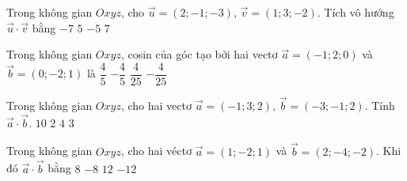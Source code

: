 

\begin{ex}%
	Trong không gian $Oxyz$, cho $\overrightarrow{u}=(2;-1;-3)$, $\overrightarrow{v}=(1;3;-2)$.  Tích vô hướng $\overrightarrow{u}\cdot \overrightarrow{v}$ bằng
	 \choice
		{$-7$} 
		{\True $5$} 
		 {$-5$}
		{$7$} 
\end{ex}

\begin{ex}%
	Trong không gian  $Oxyz$, cosin của góc tạo bởi hai vectơ $\overrightarrow{a}=(-1;2;0)$ và $\overrightarrow{b}=(0;-2;1)$ là
	\choice 
		 {$\dfrac{4}{5}$}
		{\True $-\dfrac{4}{5}$} 
		{$\dfrac{4}{25}$} 
		 {$-\dfrac{4}{25}$}
\end{ex}

\begin{ex}%
	Trong không gian  $Oxyz$, cho hai vectơ $\overrightarrow{a}=(-1;3;2)$, $\overrightarrow{b}=(-3;-1;2)$. Tính $\overrightarrow{a} \cdot \overrightarrow{b}$.
	\choice 
		{$10$} 
		{$2$} 
		 {\True $4$}
		{$3$} 
\end{ex}

\begin{ex}%
	Trong không gian $Oxyz$, cho hai véctơ $\overrightarrow{a}=(1;-2;1)$ và $\overrightarrow{b}=(2;-4;-2)$.  Khi đó $\overrightarrow{a} \cdot \overrightarrow{b}$ bằng
	\choice 
		{\True $8$} 
		{$-8$} 
		{$12$} 
		 {$-12$}
\end{ex}

